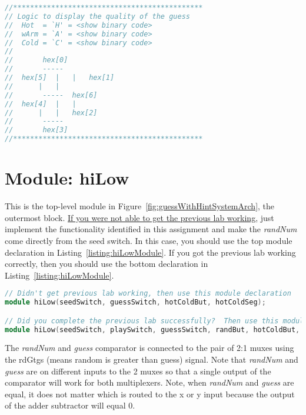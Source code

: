 \begin{lstlisting}[language=Verilog,
 caption={A comment block describing the pattern of illuminated segment for each guess hint..},
 label={listing:hotColdGuess},
 frame=single]
//*********************************************
// Logic to display the quality of the guess
//	Hot  = `H' = <show binary code>
//	wArm = `A' = <show binary code>
//	Cold = `C' = <show binary code>
//
//		 hex[0]
//		 -----
//	hex[5]	|	|	hex[1]
//		|	|	
//		 -----	hex[6]
//	hex[4]	|	|
//		|	|	hex[2]
//		 -----
//		 hex[3]
//*********************************************
\end{lstlisting}


\section{Module: hiLow}
This is the top-level module in Figure~\ref{fig:guessWithHintSystemArch}, the outermost
block. \uline{If you were not able to get the previous lab working}, just
implement the functionality identified in this assignment and make the
\emph{randNum} come directly from the seed switch. In this case, you
should use the top module declaration in Listing~\ref{listing:hiLowModule}. If you got the
previous lab working correctly, then you should use the bottom
declaration in Listing~\ref{listing:hiLowModule}.



\begin{lstlisting}[language=Verilog,
 caption={The module declaration for the enhanced hiLow module if you did or did 
 not get the previous lab working.},
 label={listing:hiLowModule},
 frame=single]
 // Didn't get previous lab working, then use this module declaration
module hiLow(seedSwitch, guessSwitch, hotColdBut, hotColdSeg);

// Did you complete the previous lab successfully?  Then use this module declaration.
module hiLow(seedSwitch, playSwitch, guessSwitch, randBut, hotColdBut, hiLowBut, randMsbSeg, randLsbSeg, greenLEDs, hotColdSeg, hiLowSeg);
 \end{lstlisting}
 
The \emph{randNum} and \emph{guess} comparator is connected to the pair of 2:1 muxes 
using the rdGtgs (means random is greater than guess) signal.
 Note that \emph{randNum} and \emph{guess} are on different
inputs to the 2 muxes so that a single output of the comparator will
work for both multiplexers. Note, when \emph{randNum} and \emph{guess}
are equal, it does not matter which is routed to the x or y input
because the output of the adder subtractor will equal 0.

